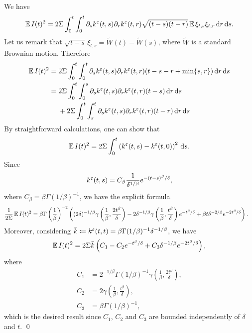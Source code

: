 \documentclass[10pt]{article}
\begin{document}
We have
\begin{equation}
\operatorname{\mathbb{E}} I(t)^2 = 2 \Sigma \int_0^t \int_0^t \partial_s k^\varepsilon(t, s) \partial_r k^\varepsilon(t, r) \sqrt{(t- s)(t-r)} \operatorname{\mathbb{E}} \xi_{t,s}\xi_{t,r} \,\mathrm{d} r \,\mathrm{d} s.
\end{equation}
Let us remark that $\sqrt{t-s}\, \xi_{t,s} = \widetilde W(t) - \widetilde W(s)$, where $\widetilde W$ is a standard Brownian motion. Therefore 
\begin{equation}
\begin{aligned}
\operatorname{\mathbb{E}} I(t)^2 &= 2\Sigma \int_0^t \int_0^t \partial_s k^\varepsilon(t, s) \partial_r k^\varepsilon(t, r) (t-s-r+\min\{s,r\}) \,\mathrm{d} r \,\mathrm{d} s \\
&= 
\begin{aligned}[t]
& 2\Sigma \int_0^t \int_0^s \partial_s k^\varepsilon(t, s) \partial_r k^\varepsilon(t, r) (t-s) \,\mathrm{d} r \,\mathrm{d} s \\
&+ 2\Sigma \int_0^t \int_s^t \partial_s k^\varepsilon(t, s) \partial_r k^\varepsilon(t, r) (t-r) \,\mathrm{d} r \,\mathrm{d} s 
\end{aligned}
\end{aligned}
\end{equation}
By straightforward calculations, one can show that
\begin{equation}
\operatorname{\mathbb{E}} I(t)^2 = 2\Sigma \int_0^t \left(k^\varepsilon(t,s) - k^\varepsilon(t,0)\right)^2 \,\mathrm{d} s.
\end{equation}
Since
\begin{equation}
k^\varepsilon(t, s) = C_\beta\frac1{\delta^{1/\beta}} e^{-(t-s)^\beta / \delta},
\end{equation}
where $C_\beta = \beta \Gamma(1/\beta)^{-1}$, we have the explicit formula
\begin{equation}
\begin{aligned}
\frac1{2\Sigma }\operatorname{\mathbb{E}} I(t)^2 &= \beta\Gamma\left(\frac1\beta\right)^{-2} \left((2\delta)^{-1/\beta}\gamma\left(\frac1\beta, \frac{2t^\beta}{\delta}\right) -2 \delta^{-1/\beta}\gamma\left(\frac1\beta, \frac{t^\beta}{\delta}\right)e^{-t^\beta/\delta} + \beta t \delta^{-2/\beta} e^{-2t^\beta/\delta}\right).
\end{aligned}
\end{equation}
Moreover, considering $\bar k \coloneqq k^\varepsilon(t, t) = \beta \Gamma(1/\beta)^{-1}\delta^{-1/\beta}$, we have
\begin{equation}
\operatorname{\mathbb{E}} I(t)^2 = 2 \Sigma \bar k  \left( C_1 - C_2 e^{-t^\beta/\delta} + C_3 \delta^{-1/\beta} e^{-2t^\beta/\delta}\right),
\end{equation}
where 
\begin{equation}\label{eq:LemmaDiffusionConstants}
\begin{aligned}
C_1 &= 2^{-1/\beta} \Gamma(1/\beta)^{-1} \gamma\left(\frac1\beta, \frac{2t^\beta}{\delta}\right), \\
C_2 &= 2 \gamma\left(\frac1\beta, \frac{t^\beta}{\delta}\right),\\
C_3 &= \beta \Gamma(1/\beta)^{-1},
\end{aligned}
\end{equation}
which is the desired result since $C_1$, $C_2$ and $C_3$ are bounded independently of $\delta$ and $t$. \qed
\end{document}
